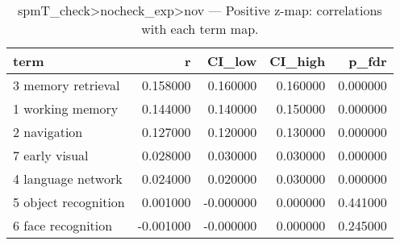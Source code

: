\begin{table}
\caption{spmT_check>nocheck_exp>nov — Positive z-map: correlations with each term map.}
\label{tab:spmT_check>nocheck_exp>nov_pos}
\begin{tabular}{lrrrr}
\toprule
term & r & CI\_low & CI\_high & p\_fdr \\
\midrule
3 memory retrieval & 0.158000 & 0.160000 & 0.160000 & 0.000000 \\
1 working memory & 0.144000 & 0.140000 & 0.150000 & 0.000000 \\
2 navigation & 0.127000 & 0.120000 & 0.130000 & 0.000000 \\
7 early visual & 0.028000 & 0.030000 & 0.030000 & 0.000000 \\
4 language network & 0.024000 & 0.020000 & 0.030000 & 0.000000 \\
5 object recognition & 0.001000 & -0.000000 & 0.000000 & 0.441000 \\
6 face recognition & -0.001000 & -0.000000 & 0.000000 & 0.245000 \\
\bottomrule
\end{tabular}
\end{table}
